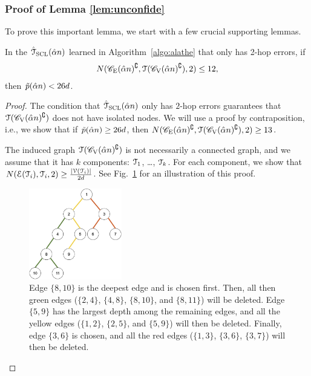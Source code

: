 \subsubsection{Proof of Lemma \ref{lem:unconfide}}
To prove this important lemma, we start with a few crucial supporting lemmas. 
\begin{lemma}\label{lem:tilpbound}
	In the $\hat{\mathcal{T}}_{\rm{SCL}}(\hat{\alpha} n)$ learned in Algorithm~\ref{algo:alathe} that only has 2-hop errors, if 
	\begin{align}
	    N(\mathscr{C}_{\mathrm{E}}(\hat{\alpha} n)^{\complement},\mathcal{T}(\mathscr{C}_{\mathrm{V}}(\hat{\alpha} n)^{\complement}),2)\leq 12,
	\end{align}
	then $\tilde{p}(\hat{\alpha} n)<26d$.
\end{lemma}
\begin{proof}
	The condition that $\hat{\mathcal{T}}_{\rm{SCL}}(\hat{\alpha} n)$ only has $2$-hop errors guarantees that $\mathcal{T}(\mathscr{C}_{\mathrm{V}}(\hat{\alpha} n)^{\complement})$ does not have isolated nodes. We will use a proof by contraposition, i.e., we show that if $\tilde{p}(\hat{\alpha} n)\geq 26d$, then $N(\mathscr{C}_{\mathrm{E}}(\hat{\alpha} n)^{\complement},\mathcal{T}(\mathscr{C}_{\mathrm{V}}(\hat{\alpha} n)^{\complement}),2)\geq 13$.

	The induced graph $\mathcal{T}(\mathscr{C}_{\mathrm{V}}(\hat{\alpha} n)^{\complement})$ is not necessarily a connected graph, and we assume that it has $k$ components: $\mathcal{T}_{1}$, \ldots, $\mathcal{T}_{k}$. For each component, we 
	show that $N(\mathcal{E}(\mathcal{T}_{i}),\mathcal{T}_{i},2)\geq \frac{|\mathcal{V}(\mathcal{T}_{i})|}{2d}$. See Fig.~\ref{fig:packing} for an illustration of this proof.
	
	\begin{figure}[t] 
		\centering 
		\includegraphics[width=0.36\textwidth]{packing.eps} 
		\caption{Edge $\{8,10\}$ is the deepest edge and is  chosen first. Then, all then green edges ($\{2,4\}$, $\{4,8\}$, $\{8,10\}$, and $\{8,11\}$) will be deleted. Edge $\{5,9\}$ has the largest depth among the remaining edges, and all the yellow edges ($\{1,2\}$, $\{2,5\}$, and $\{5,9\}$) will then be deleted. Finally, edge $\{3,6\}$ is chosen, and all the red edges ($\{1,3\}$, $\{3,6\}$, $\{3,7\}$) will then be deleted.} 
		\label{fig:packing} 
	\end{figure}
	

\end{proof}
